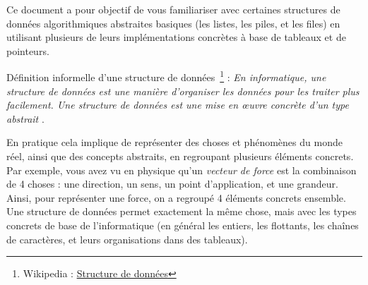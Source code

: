 \documentclass[11pt,a4paper]{article}
\begin{document}
\EncadreTitre

\bigskip


%
%

\bigskip


Ce document a pour objectif de vous familiariser avec certaines structures de données algorithmiques abstraites basiques (les listes, les piles, et les files) en utilisant plusieurs de leurs implémentations concrètes à base de tableaux et de pointeurs.

\bigskip

Définition informelle d'une structure de données~\footnote{Wikipedia : \href{https://fr.wikipedia.org/wiki/Structure_de_donn\%C3\%A9es}{Structure de données}} : \og \textit{En informatique, une structure de données est une manière d'organiser les données pour les traiter plus facilement. Une structure de données est une mise en œuvre concrète d'un type abstrait} \fg .

\medskip

En pratique cela implique de représenter des choses et phénomènes du monde réel, ainsi que des concepts abstraits, en regroupant plusieurs éléments concrets.
Par exemple, vous avez vu en physique qu'un \textit{vecteur de force} est la combinaison de 4 choses : une direction, un sens, un point d'application, et une grandeur.
Ainsi, pour représenter une force, on a regroupé 4 éléments concrets ensemble.
Une structure de données permet exactement la même chose, mais avec les types concrets de base de l'informatique (en général les entiers, les flottants, les chaînes de caractères, et leurs organisations dans des tableaux).

\medskip
\end{document}
